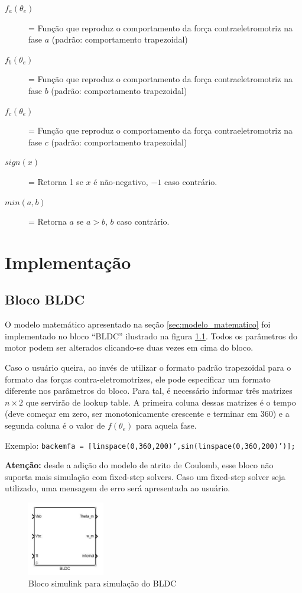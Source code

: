 \begin{description}
            \item[$f_a(\theta_e)$] = Função que reproduz o comportamento da força contraeletromotriz na fase $a$ (padrão: comportamento trapezoidal)
            \item[$f_b(\theta_e)$] = Função que reproduz o comportamento da força contraeletromotriz na fase $b$ (padrão: comportamento trapezoidal)
            \item[$f_c(\theta_e)$] = Função que reproduz o comportamento da força contraeletromotriz na fase $c$ (padrão: comportamento trapezoidal)

            \item[$sign(x)$] = Retorna 1 se $x$ é não-negativo, $-1$ caso contrário.
            \item[$min(a,b)$] = Retorna $a$ se $a>b$, $b$ caso contrário.


        \end{description}

\chapter{Implementação}

    \section{Bloco BLDC}
        O modelo matemático apresentado na seção \ref{sec:modelo_matematico} foi implementado no bloco ``BLDC'' ilustrado na figura \ref{fig:bloco_BLDC}. Todos os parâmetros do motor podem ser alterados clicando-se duas vezes em cima do bloco.

        Caso o usuário queira, ao invés de utilizar o formato padrão trapezoidal para o formato das forças contra-eletromotrizes, ele pode especificar um formato diferente nos parâmetros do bloco. Para tal, é necessário informar três matrizes $n\times2$ que servirão de lookup table. A primeira coluna dessas matrizes é o tempo (deve começar em zero, ser monotonicamente crescente e terminar em 360) e a segunda coluna é o valor de $f(\theta_e)$ para aquela fase.

        Exemplo: \texttt{backemfa = [linspace(0,360,200)',sin(linspace(0,360,200)')];}

        \textbf{Atenção:} desde a adição do modelo de atrito de Coulomb, esse bloco não suporta mais simulação com fixed-step solvers. Caso um fixed-step solver seja utilizado, uma mensagem de erro será apresentada ao usuário.
        \begin{figure}[ht]
            \centering
            \includegraphics[width=0.3\textwidth]{bloco_BLDC}
            \caption{Bloco simulink para simulação do BLDC}
            \label{fig:bloco_BLDC}
        \end{figure}

